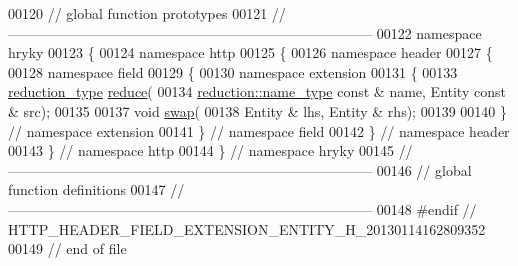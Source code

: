 \begin{DoxyCode}
00120 \textcolor{comment}{// global function prototypes}
00121 \textcolor{comment}{//
      ------------------------------------------------------------------------------}
00122 \textcolor{keyword}{namespace }hryky
00123 \{
00124 \textcolor{keyword}{namespace }http
00125 \{
00126 \textcolor{keyword}{namespace }header
00127 \{
00128 \textcolor{keyword}{namespace }field
00129 \{
00130 \textcolor{keyword}{namespace }extension
00131 \{
00133     \hyperlink{namespacehryky_a343a9a4c36a586be5c2693156200eadc}{reduction_type} \hyperlink{namespacehryky_1_1http_a08fc36a78a8e2908140fcd102829a566}{reduce}(
00134         \hyperlink{namespacehryky_1_1reduction_ac686c30a4c8d196bbd0f05629a6b921f}{reduction::name_type} \textcolor{keyword}{const} & name, Entity \textcolor{keyword}{const} & src);
00135 
00137     \textcolor{keywordtype}{void} \hyperlink{namespacehryky_1_1http_a38e62595ad532d18fbc65ceb61973aec}{swap}(
00138         Entity & lhs, Entity & rhs);
00139 
00140 \} \textcolor{comment}{// namespace extension}
00141 \} \textcolor{comment}{// namespace field}
00142 \} \textcolor{comment}{// namespace header}
00143 \} \textcolor{comment}{// namespace http}
00144 \} \textcolor{comment}{// namespace hryky}
00145 \textcolor{comment}{//
      ------------------------------------------------------------------------------}
00146 \textcolor{comment}{// global function definitions}
00147 \textcolor{comment}{//
      ------------------------------------------------------------------------------}
00148 \textcolor{preprocessor}{#endif // HTTP\_HEADER\_FIELD\_EXTENSION\_ENTITY\_H\_20130114162809352}
00149 \textcolor{preprocessor}{}\textcolor{comment}{// end of file}
\end{DoxyCode}
